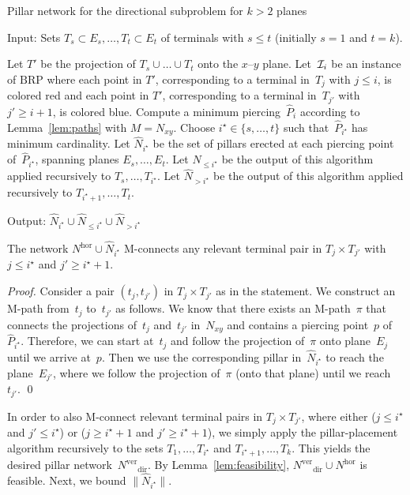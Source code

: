 \documentclass[11pt]{llncs}
\newcommand{\Nhor}{\ensuremath{N^\mathrm{hor}}\xspace}
\newcommand{\Nver}{\ensuremath{N^\mathrm{ver}}\xspace}
\newcommand{\dir}{\ensuremath{\mathrm{dir}}}
\newcommand{\Nxy}{\ensuremath{N_{xy}}\xspace}
\newcommand{\BRP}{\ensuremath{\mathrm{BRP}}\xspace}
\newenvironment{pf}{\begin{proof}}{\qed\end{proof}}
\begin{document}
\begin{algorithm}[htpb]
\caption{Pillar network for the directional subproblem for $k>2$ planes}
\label{alg:kpillars}
Input: Sets $T_s \subset E_s, \dots, T_t \subset E_t$ of terminals
with $s\le t$ (initially $s=1$ and $t=k$).   
\begin{algorithmic}[1]
\STATE Let $T'$ be the projection of $T_s \cup \dots \cup T_t$ onto
the $x$--$y$ plane. 
\STATE Let~${\cal I}_i$ be an instance of \BRP where each point in
$T'$, corresponding to a terminal in~$T_j$ with $j\leq i$, is 
colored red and each point in $T'$, corresponding to a
terminal in~$T_{j'}$ with $j'\geq i+1$, is colored blue. 
\STATE Compute a minimum piercing~$\hat{P}_i$ according to Lemma~\ref{lem:paths} with $M=\Nxy$.
\ENDFOR
\STATE Choose $i^\star \in \{s,\dots,t\}$ such that~$\hat{P}_{i^\star}$ has minimum cardinality. 
\STATE Let $\hat{N}_{i^\star}$ be the set of pillars erected at each
piercing point of~$\hat{P}_{i^\star}$, spanning planes $E_s, \dots, E_t$. 
\STATE Let $\hat{N}_{\le i^\star}$ be the output of this algorithm
applied recursively to $T_s, \dots, T_{i^{\star}}$.
\STATE Let $\hat{N}_{> i^\star}$ be the output of this algorithm
applied recursively to $T_{i^{\star}+1}, \dots, T_t$.
\end{algorithmic}
Output: $\hat{N}_{i^\star} \cup \hat{N}_{\le i^\star} \cup \hat{N}_{> i^\star}$
\end{algorithm}

\begin{lemma}
  \label{lem:feasibility}
  The network $\Nhor \cup \hat{N}_{i^\star}$ M-connects any relevant
  terminal pair in $T_j \times T_{j'}$ with $j \le i^\star$ and 
  $j' \ge i^\star+1$.
\end{lemma}

\begin{pf}
  Consider a pair $(t_j,t_{j'})$ in $T_j \times T_{j'}$ as in the
  statement.  We construct an M-path from~$t_j$ to~$t_{j'}$ as
  follows.  We know that there exists an M-path~$\pi$ that connects the
  projections of~$t_j$ and~$t_{j'}$ in~\Nxy and contains a piercing
  point~$p$ of~$\hat{P}_{i^\star}$.  Therefore, we can start at~$t_j$
  and follow the 
  projection of~$\pi$ onto plane~$E_j$ until we arrive at~$p$.  Then we
  use the corresponding pillar in~$\hat{N}_{i^\star}$ to reach the
  plane~$E_{j'}$, where we follow the projection of~$\pi$ (onto that
  plane) until we reach~$t_{j'}$.  
\end{pf}

In order to also M-connect relevant terminal pairs in $T_j \times T_{j'}$, where
either ($j \le i^\star$ and $j' \le i^\star$) or ($j \ge i^\star+1$
and $j' \ge i^\star+1$), we simply apply
the pillar-placement algorithm recursively to the sets
$T_1,\dots,T_{i^\star}$ and $T_{i^\star+1},\dots,T_k$. 
This yields the desired pillar network~$\Nver_\dir$.  By
Lemma~\ref{lem:feasibility}, $\Nver_\dir \cup \Nhor$ is feasible.
Next, we bound $\|\hat{N}_{i^\star}\|$.
\end{document}
